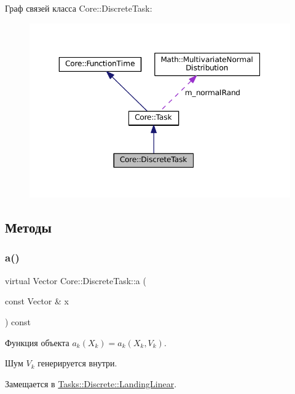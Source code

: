 Граф связей класса Core\+:\+:Discrete\+Task\+:
\nopagebreak
\begin{figure}[H]
\begin{center}
\leavevmode
\includegraphics[width=350pt]{class_core_1_1_discrete_task__coll__graph}
\end{center}
\end{figure}


\subsection{Методы}
\hypertarget{class_core_1_1_discrete_task_a49d377fa365d5ec3e05962ee751f2d9e}{}\label{class_core_1_1_discrete_task_a49d377fa365d5ec3e05962ee751f2d9e} 
\subsubsection{\texorpdfstring{a()}{a()}}
{\footnotesize\ttfamily virtual Vector Core\+::\+Discrete\+Task\+::a (\begin{DoxyParamCaption}\item[{const Vector \&}]{x }\end{DoxyParamCaption}) const\hspace{0.3cm}{\ttfamily [pure virtual]}}



Функция объекта $a_k(X_k) = a_k(X_k, V_k)$. 

Шум $V_k$ генерируется внутри. 

Замещается в \hyperlink{class_tasks_1_1_discrete_1_1_landing_linear_af0c0c48603fc226055ee233f93fa21fc}{Tasks\+::\+Discrete\+::\+Landing\+Linear}.

